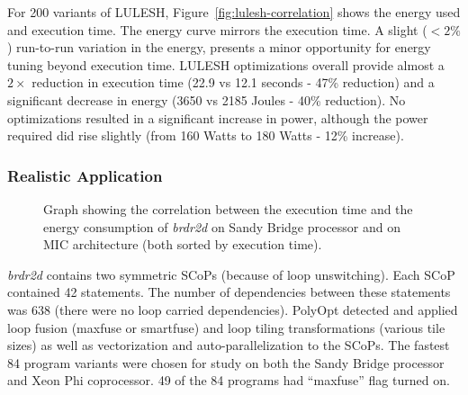 For 200 variants of LULESH, Figure~\ref{fig:lulesh-correlation} shows the energy used and 
execution time. The energy curve mirrors the execution time. A slight ($<2\%$)
run-to-run variation in the energy, presents a minor
opportunity for energy tuning beyond execution time. LULESH optimizations 
overall provide almost a $2\times$ reduction in execution time 
(22.9 vs 12.1 seconds - 47\% reduction) and a significant decrease in energy (3650 vs 2185 Joules - 40\% reduction).
No optimizations resulted in a significant increase in power, although the power
required did rise slightly (from 160 Watts to 180 Watts - 12\% increase).

\subsubsection{Realistic Application}

\begin{figure}[bt]
\centering
{}
\caption{Graph showing the correlation between the execution time and the energy 
consumption of \emph{brdr2d} on Sandy Bridge processor and
on MIC architecture (both sorted by execution time).}
\label{fig:Brdr2d-TE}
\end{figure}

\emph {brdr2d} contains two symmetric SCoPs (because of loop unswitching).
Each SCoP contained 42 statements. The number of dependencies between these 
statements was 638 (there were no loop carried dependencies). PolyOpt
detected and applied loop fusion (maxfuse or smartfuse) and loop tiling transformations
(various tile sizes) as
well as vectorization and auto-parallelization to the SCoPs. The fastest 84 program
variants were chosen for study on both the Sandy Bridge processor and Xeon Phi coprocessor.
49 of the 84 programs had ``maxfuse'' flag turned on.

